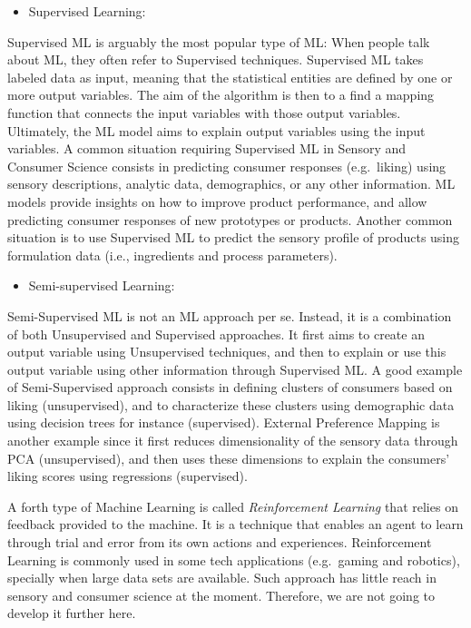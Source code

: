 \documentclass[
]{krantz}
\providecommand{\tightlist}{%
  \setlength{\itemsep}{0pt}\setlength{\parskip}{0pt}}
\renewenvironment{quote}{\begin{VF}}{\end{VF}}
\begin{document}
\begin{itemize}
\tightlist
\item
  Supervised Learning:
\end{itemize}

Supervised ML is arguably the most popular type of ML: When people talk about ML, they often refer to Supervised techniques. Supervised ML takes labeled data as input, meaning that the statistical entities are defined by one or more output variables. The aim of the algorithm is then to a find a mapping function that connects the input variables with those output variables. Ultimately, the ML model aims to explain output variables using the input variables.
A common situation requiring Supervised ML in Sensory and Consumer Science consists in predicting consumer responses (e.g.~liking) using sensory descriptions, analytic data, demographics, or any other information. ML models provide insights on how to improve product performance, and allow predicting consumer responses of new prototypes or products. Another common situation is to use Supervised ML to predict the sensory profile of products using formulation data (i.e., ingredients and process parameters).

\begin{itemize}
\tightlist
\item
  Semi-supervised Learning:
\end{itemize}

Semi-Supervised ML is not an ML approach per se. Instead, it is a combination of both Unsupervised and Supervised approaches. It first aims to create an output variable using Unsupervised techniques, and then to explain or use this output variable using other information through Supervised ML. A good example of Semi-Supervised approach consists in defining clusters of consumers based on liking (unsupervised), and to characterize these clusters using demographic data using decision trees for instance (supervised). External Preference Mapping is another example since it first reduces dimensionality of the sensory data through PCA (unsupervised), and then uses these dimensions to explain the consumers' liking scores using regressions (supervised).

\begin{quote}
A forth type of Machine Learning is called \emph{Reinforcement Learning} that relies on feedback provided to the machine. It is a technique that enables an agent to learn through trial and error from its own actions and experiences. Reinforcement Learning is commonly used in some tech applications (e.g.~gaming and robotics), specially when large data sets are available. Such approach has little reach in sensory and consumer science at the moment. Therefore, we are not going to develop it further here.
\end{quote}
\end{document}
